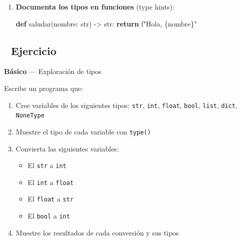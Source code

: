 \documentclass[
  doc,
  floatsintext,
  longtable,
  a4paper,
  nolmodern,
  notxfonts,
  notimes,
  12pt,
  colorlinks=true,linkcolor=blue,citecolor=blue,urlcolor=blue]{apa7}
\newenvironment{Shaded}{\begin{snugshade}}{\end{snugshade}}
\newcommand{\BuiltInTok}[1]{\textcolor[rgb]{0.00,0.23,0.31}{#1}}
\newcommand{\CommentTok}[1]{\textcolor[rgb]{0.37,0.37,0.37}{#1}}
\newcommand{\ControlFlowTok}[1]{\textcolor[rgb]{0.00,0.23,0.31}{\textbf{#1}}}
\newcommand{\DecValTok}[1]{\textcolor[rgb]{0.68,0.00,0.00}{#1}}
\newcommand{\KeywordTok}[1]{\textcolor[rgb]{0.00,0.23,0.31}{\textbf{#1}}}
\newcommand{\NormalTok}[1]{\textcolor[rgb]{0.00,0.23,0.31}{#1}}
\newcommand{\OperatorTok}[1]{\textcolor[rgb]{0.37,0.37,0.37}{#1}}
\newcommand{\SpecialCharTok}[1]{\textcolor[rgb]{0.37,0.37,0.37}{#1}}
\newcommand{\SpecialStringTok}[1]{\textcolor[rgb]{0.13,0.47,0.30}{#1}}
\newcommand{\StringTok}[1]{\textcolor[rgb]{0.13,0.47,0.30}{#1}}
\newcommand{\VariableTok}[1]{\textcolor[rgb]{0.07,0.07,0.07}{#1}}
\providecommand{\tightlist}{%
  \setlength{\itemsep}{0pt}\setlength{\parskip}{0pt}}
\begin{document}
\begin{enumerate}
\begin{Shaded}
\begin{Highlighting}[]
\CommentTok{\# Convención}
\NormalTok{nombres\_lista }\OperatorTok{=}\NormalTok{ [}\StringTok{"Ana"}\NormalTok{, }\StringTok{"Carlos"}\NormalTok{]}
\NormalTok{contador\_int }\OperatorTok{=} \DecValTok{5}
\NormalTok{es\_valido\_bool }\OperatorTok{=} \VariableTok{True}
\end{Highlighting}
\end{Shaded}
\item
  \textbf{Documenta los tipos en funciones} (type hints):

\begin{Shaded}
\begin{Highlighting}[]
\KeywordTok{def}\NormalTok{ saludar(nombre: }\BuiltInTok{str}\NormalTok{) }\OperatorTok{{-}\textgreater{}} \BuiltInTok{str}\NormalTok{:}
    \ControlFlowTok{return} \SpecialStringTok{f"Hola, }\SpecialCharTok{\{}\NormalTok{nombre}\SpecialCharTok{\}}\SpecialStringTok{"}
\end{Highlighting}
\end{Shaded}
\end{enumerate}

\subsection{📝 Ejercicio}\label{ejercicio}

\textbf{Básico} --- Exploración de tipos

Escribe un programa que:

\begin{enumerate}
\def\labelenumi{\arabic{enumi}.}
\tightlist
\item
  Cree variables de los siguientes tipos: \texttt{str}, \texttt{int},
  \texttt{float}, \texttt{bool}, \texttt{list}, \texttt{dict},
  \texttt{NoneType}
\item
  Muestre el tipo de cada variable con \texttt{type()}
\item
  Convierta las siguientes variables:

  \begin{itemize}
  \tightlist
  \item
    El \texttt{str} a \texttt{int}
  \item
    El \texttt{int} a \texttt{float}
  \item
    El \texttt{float} a \texttt{str}
  \item
    El \texttt{bool} a \texttt{int}
  \end{itemize}
\item
  Muestre los resultados de cada conversión y sus tipos
\end{enumerate}
\end{document}
